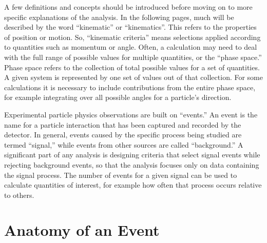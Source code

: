 A few definitions and concepts should be introduced 
before moving on to more specific explanations 
of the analysis.  
In the following pages, much will be described by the word 
``kinematic'' or ``kinematics''.  
This refers to the properties of position or motion.  
So, ``kinematic criteria'' means selections applied according to 
quantities such as momentum or angle.  
Often, a calculation may need to deal with 
the full range of possible values 
for multiple quantities, 
or the ``phase space.'' 
Phase space refers to the collection of total 
possible values for a set of quantities.  
A given system is represented by one set of 
values out of that collection.  
For some calculations it is necessary to include 
contributions from the entire phase space, 
for example integrating over all possible 
angles for a particle's direction.  

Experimental particle physics 
observations are %
built on ``events.''
An event is the name for a particle interaction %
that has been captured and recorded by the detector.  
In general, %
events caused by the specific process     
being studied are termed ``signal,'' 
while 
events 
from other sources 
are called ``background.'' 
A significant part of any analysis is designing 
criteria that select signal events while 
rejecting background events, 
so that the analysis focuses only on data containing 
the signal %
process.  
The number of events for a given signal can be used 
to calculate quantities of interest, 
for example how often that process  
occurs relative to others.  

\section{Anatomy of an Event}
\label{over:anatomy}


